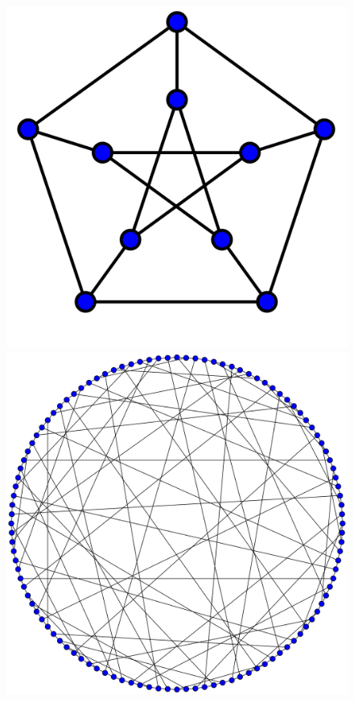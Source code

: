 \documentclass[11pt]{beamer}
\begin{document}
\begin{frame}
\begin{center}
\begin{figure}[h!]
\includegraphics[scale=0.06]{Petersen}
\hspace*{3mm}
\includegraphics[scale=0.06]{Balaban}

\end{figure}
\end{center}
\end{frame}
\end{document}
